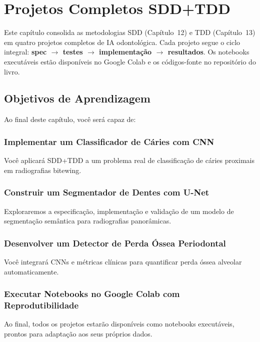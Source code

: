 \chapter{Projetos Completos SDD+TDD}
\label{cap:projetos-guiados}
\nivelquatro

Este capítulo consolida as metodologias SDD (Capítulo~12) e TDD
(Capítulo~13) em quatro projetos completos de IA odontológica. Cada
projeto segue o ciclo integral: \textbf{spec $\rightarrow$ testes
$\rightarrow$ implementação $\rightarrow$ resultados}. Os notebooks
executáveis estão disponíveis no Google Colab e os códigos-fonte no
repositório do livro.

\section{Objetivos de Aprendizagem}

Ao final deste capítulo, você será capaz de:

\subsection{Implementar um Classificador de Cáries com CNN}
Você aplicará SDD+TDD a um problema real de classificação de cáries proximais em radiografias bitewing.

\subsection{Construir um Segmentador de Dentes com U-Net}
Exploraremos a especificação, implementação e validação de um modelo de segmentação semântica para radiografias panorâmicas.

\subsection{Desenvolver um Detector de Perda Óssea Periodontal}
Você integrará CNNs e métricas clínicas para quantificar perda óssea alveolar automaticamente.

\subsection{Executar Notebooks no Google Colab com Reprodutibilidade}
Ao final, todos os projetos estarão disponíveis como notebooks executáveis, prontos para adaptação aos seus próprios dados.

